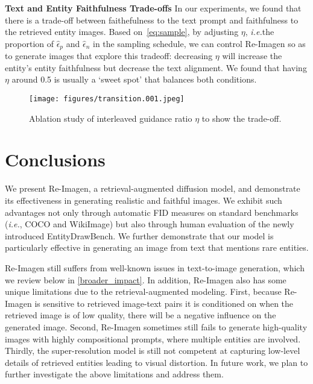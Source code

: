 \documentclass{article} \usepackage{iclr2023_conference,times}
\newcommand{\ie}{\textit{i.e.}}
\newcommand{\modelname}{{Re-Imagen}\xspace}
\begin{document}
\noindent \textbf{Text and Entity Faithfulness Trade-offs}
In our experiments, we found that there is a trade-off between faithefulness to the text prompt and faithfulness to the retrieved entity images. Based on~\autoref{eq:sample}, by adjusting $\eta$, \ie the proportion of $\hat{\epsilon}_p$ and $\hat{\epsilon}_n$ in the sampling schedule, we can control \modelname so as to generate images that explore this tradeoff: decreasing $\eta$ will increase the entity's entity faithfulness but decrease the text alignment. We found that having $\eta$ around 0.5 is usually a `sweet spot' that balances both conditions.
\begin{figure}[!t]
    \centering
    \texttt{[image: figures/transition.001.jpeg]}
    \vspace{-2ex}
    \caption{Ablation study of interleaved guidance ratio $\eta$ to show the trade-off. }
    \vspace{-1ex}
    \label{fig:transition}
\end{figure}


\section{Conclusions}
We present \modelname, a retrieval-augmented diffusion model, and demonstrate its effectiveness in generating realistic and faithful images. We exhibit such advantages not only through automatic FID measures on standard benchmarks (\ie, COCO and WikiImage) but also through human evaluation of the newly introduced EntityDrawBench. We further demonstrate that our model is particularly effective in generating an image from text that mentions rare entities. 

\modelname still suffers from well-known issues in text-to-image generation, which we review below in \autoref{broader_impact}. In addition, \modelname also has some unique limitations due to the retrieval-augmented modeling. First, because \modelname is sensitive to retrieved image-text pairs it is conditioned on when the retrieved image is of low quality, there will be a negative influence on the generated image. Second, \modelname sometimes still fails to generate high-quality images with highly compositional prompts, where multiple entities are involved. Thirdly, the super-resolution model is still not competent at capturing low-level details of retrieved entities leading to visual distortion. In future work, we plan to further investigate the above limitations and address them.
\end{document}

